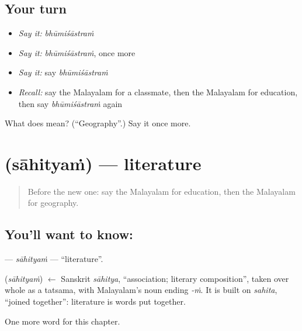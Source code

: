\subsection*{Your turn}
\begin{itemize}
\raggedright
  \item \emph{Say it:} \emph{bhūmiśāstraṁ}
  \item \emph{Say it:} \emph{bhūmiśāstraṁ}, once more
  \item \emph{Say it:} say \emph{bhūmiśāstraṁ}
  \item \emph{Recall:} say the Malayalam for a classmate, then the Malayalam for education, then say \emph{bhūmiśāstraṁ} again
\end{itemize}

\begin{tcolorbox}[breakable,colback=teal!4,colframe=teal!35!black,title={Before you move on}]
What does  mean? (\textquotedblleft{}Geography\textquotedblright{}.) Say it once more.
\end{tcolorbox}
\section[\texorpdfstring{\ml{സാഹിത്യം} (sāhityaṁ)}{സാഹിത്യം (sāhityaṁ)}]{ (sāhityaṁ) — literature}

\label{lesson:ML-C222-sahityam}



\begin{quote}
Before the new one: say the Malayalam for education, then the Malayalam for geography.
\end{quote}

\subsection*{You'll want to know: }
\textbf{} — \emph{sāhityaṁ} — \textquotedblleft{}literature\textquotedblright{}.

\begin{cousinweb}
\textbf{} (\emph{sāhityaṁ}) $\leftarrow$ Sanskrit \emph{sāhitya}, \textquotedblleft{}association; literary composition\textquotedblright{}, taken over whole as a tatsama, with Malayalam's noun ending \emph{-ṁ}. It is built on \emph{sahita}, \textquotedblleft{}joined together\textquotedblright{}: literature is words put together.
\end{cousinweb}

\begin{grammarlens}[title={What you've built}]
One more word for this chapter.
\end{grammarlens}

